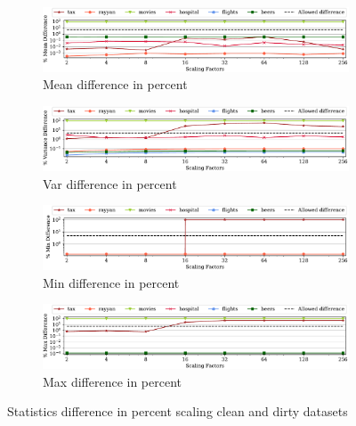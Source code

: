 \begin{figure}[!ht]
    \centering 
    \centering
\begin{subfigure}{\textwidth}
    \includegraphics[width=\textwidth]{figures/plot/all_diff/mean_diff.pdf}
    \caption{Mean difference in percent}
    \label{exp:mean_diff_per}
\end{subfigure}
\hfill
\begin{subfigure}{\textwidth}
    \includegraphics[width=\textwidth]{figures/plot/all_diff/var_diff.pdf}
    \caption{Var difference in percent}
    \label{exp:var_diff_per}
\end{subfigure}
\hfill
\begin{subfigure}{\textwidth}
    \includegraphics[width=\textwidth]{figures/plot/all_diff/min_diff.pdf}
    \caption{Min difference in percent}
    \label{exp:min_diff_per}
\end{subfigure}
\hfill
\begin{subfigure}{\textwidth}
    \includegraphics[width=\textwidth]{figures/plot/all_diff/max_diff.pdf}
    \caption{Max difference in percent}
    \label{exp:max_diff_per}
\end{subfigure}
\hfill
\caption{Statistics difference in percent scaling clean and dirty datasets}
\label{exp:per_difference_datasets}
\end{figure}
